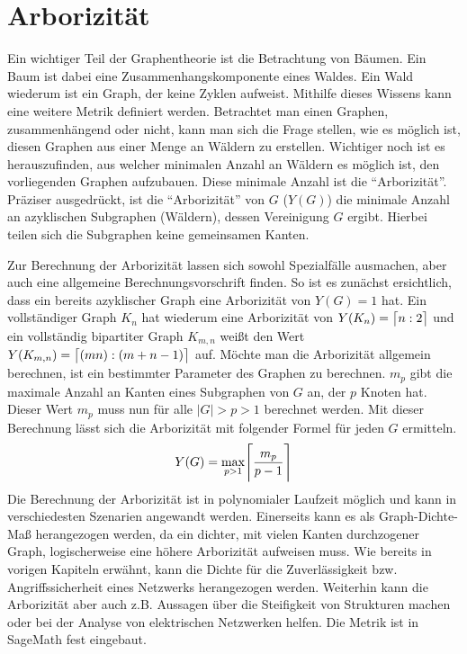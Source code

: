 \documentclass[a4paper,12pt,ngerman,chapterprefix=false,listof=totoc,bibliography=totoc]{scrreprt}
\DeclarePairedDelimiter{\ceil}{\lceil}{\rceil}
\begin{document}
\section{Arborizität}
{
Ein wichtiger Teil der Graphentheorie ist die Betrachtung von Bäumen. Ein Baum ist dabei eine Zusammenhangskomponente eines Waldes. Ein Wald wiederum ist ein Graph, der keine Zyklen aufweist. Mithilfe dieses Wissens kann eine weitere Metrik definiert werden. Betrachtet man einen Graphen, zusammenhängend oder nicht, kann man sich die Frage stellen, wie es möglich ist, diesen Graphen aus einer Menge an Wäldern zu erstellen. Wichtiger noch ist es herauszufinden, aus welcher minimalen Anzahl an Wäldern es möglich ist, den vorliegenden Graphen aufzubauen. Diese minimale Anzahl ist die "`Arborizität"'. Präziser ausgedrückt, ist die "`Arborizität"' von \(G\) (\(Y(G)\)) die minimale Anzahl an azyklischen Subgraphen (Wäldern), dessen Vereinigung \(G\) ergibt. Hierbei teilen sich die Subgraphen keine gemeinsamen Kanten. \cite{weisstein_arboricity_nodate}

Zur Berechnung der Arborizität lassen sich sowohl Spezialfälle ausmachen, aber auch eine allgemeine Berechnungsvorschrift finden. So ist es zunächst ersichtlich, dass ein bereits azyklischer Graph eine Arborizität von \(Y(G)=1\) hat. Ein vollständiger Graph \(K_n\) hat wiederum eine Arborizität von \(Y(K_n)=\ceil[\big]{n:2}\) und ein vollständig bipartiter Graph \(K_{m,n}\) weißt den Wert \(Y(K_{m,n})=\ceil[\big]{(mn):(m+n-1)}\) auf. Möchte man die Arborizität allgemein berechnen, ist ein bestimmter Parameter des Graphen zu berechnen. \(m_p\) gibt die maximale Anzahl an Kanten eines Subgraphen von \(G\) an, der \(p\) Knoten hat. Dieser Wert \(m_p\) muss nun für alle \(|G|>p>1\) berechnet werden. Mit dieser Berechnung lässt sich die Arborizität mit folgender Formel für jeden \(G\) ermitteln. \cite{weisstein_arboricity_nodate,nash-williams_edge-disjoint_1961}
\[Y(G)=\max_{p>1}\ceil[\Bigg]{\frac{m_p}{p-1}}\]
Die Berechnung der Arborizität ist in polynomialer Laufzeit möglich und kann in verschiedesten Szenarien angewandt werden. Einerseits kann es als Graph-Dichte-Maß herangezogen werden, da ein dichter, mit vielen Kanten durchzogener Graph, logischerweise eine höhere Arborizität aufweisen muss. Wie bereits in vorigen Kapiteln erwähnt, kann die Dichte für die Zuverlässigkeit bzw. Angriffssicherheit eines Netzwerks herangezogen werden. Weiterhin kann die Arborizität aber auch z.B. Aussagen über die Steifigkeit von Strukturen machen oder bei der Analyse von elektrischen Netzwerken helfen. Die Metrik ist in SageMath fest eingebaut. \cite{gabow_forests_1992,sagemath_graph_2020}

}
\end{document}
